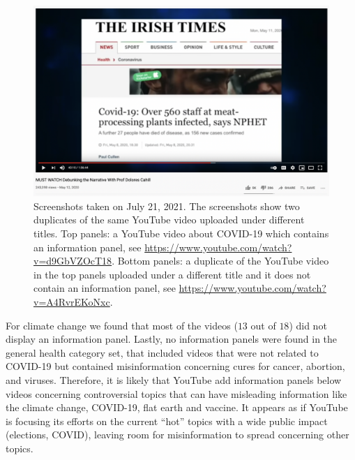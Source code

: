 \documentclass{article}
\begin{document}
\begin{figure}[h]
		\includegraphics[scale=0.2]{./img/youtube_panels/news_without_banner.png} 
	\caption{Screenshots taken on July 21, 2021. The screenshots show two duplicates of the same YouTube video uploaded under different titles. Top panels: a YouTube video about COVID-19 which contains an information panel, see \href{https://www.youtube.com/watch?v=d9GbVZOcT18}{https://www.youtube.com/watch?v=d9GbVZOcT18}. Bottom panels: a duplicate of the YouTube video in the top panels uploaded under a different title and it does not contain an information panel, see \href{https://www.youtube.com/watch?v=A4RvrEKoNxc}{https://www.youtube.com/watch?v=A4RvrEKoNxc}. }
	\label{duplicates_yt}
\end{figure}

\smallskip

For climate change we found that most of the videos ($13$ out of $18$) did not display an information panel. Lastly, no information panels were found in the general health category set, that included videos that were not related to COVID-19 but contained misinformation concerning cures for cancer, abortion, and viruses. Therefore, it is likely that YouTube add information panels below videos concerning controversial topics that can have misleading information like the climate change, COVID-19, flat earth and vaccine. It appears as if YouTube is focusing its efforts on the current ``hot'' topics with a wide public impact (elections, COVID), leaving room for misinformation to spread concerning other topics.
\end{document}

